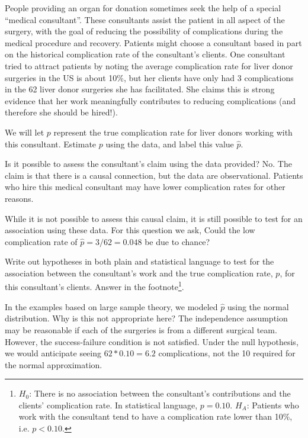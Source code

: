 People providing an organ for donation sometimes seek the help of a special ``medical consultant''. These consultants assist the patient in all aspect of the surgery, with the goal of reducing the possibility of complications during the medical procedure and recovery. Patients might choose a consultant based in part on the historical complication rate of the consultant's clients. One consultant tried to attract patients by noting the average complication rate for liver donor surgeries in the US is about 10\%, but her clients have only had 3 complications in the 62 liver donor surgeries she has facilitated. She claims this is strong evidence that her work meaningfully contributes to reducing complications (and therefore she should be hired!).

\begin{exercise}
We will let $p$ represent the true complication rate for liver donors working with this consultant. Estimate $p$ using the data, and label this value $\hat{p}$.
\end{exercise}

\begin{example}{Is it possible to assess the consultant's claim using the data provided?}
No. The claim is that there is a causal connection, but the data are observational. Patients who hire this medical consultant may have lower complication rates for other reasons.

While it is not possible to assess this causal claim, it is still possible to test for an association using these data. For this question we ask, Could the low complication rate of $\hat{p} = 3/62=0.048$ be due to chance?
\end{example}

\begin{exercise} \label{hypForAssessingConsultantWorkInLiverTransplants}
Write out hypotheses in both plain and statistical language to test for the association between the consultant's work and the true complication rate, $p$, for this consultant's clients. Answer in the footnote\footnote{$H_0$: There is no association between the consultant's contributions and the clients' complication rate. In statistical language, $p=0.10$. $H_A$: Patients who work with the consultant tend to have a complication rate lower than 10\%, i.e. $p<0.10$.}.
\end{exercise}

\begin{example}{In the examples based on large sample theory, we modeled $\hat{p}$ using the normal distribution. Why is this not appropriate here?}
The independence assumption may be reasonable if each of the surgeries is from a different surgical team. However, the success-failure condition is not satisfied. Under the null hypothesis, we would anticipate seeing $62*0.10=6.2$ complications, not the 10 required for the normal approximation.
\end{example}

